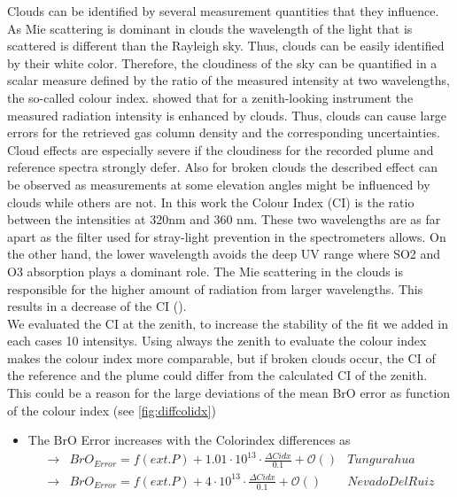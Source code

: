 \documentclass  [
  paper    = a4,
  BCOR     = 10mm,
  twoside,
  fontsize = 12pt,
  fleqn,
  toc      = bibnumbered,
  toc      = listofnumbered,
  numbers  = noendperiod,
  headings = normal,
  listof   = leveldown,
  version  = 3.03
]                                       {scrreprt}
\begin{document}
	Clouds can be identified by several measurement quantities that they influence.
	As Mie scattering is dominant in clouds the wavelength of the light that is scattered is different than the Rayleigh sky. Thus, clouds can be easily identified by their white color.
	Therefore, the cloudiness of the sky can be quantified in a scalar measure defined by the ratio of the measured intensity at two wavelengths, the so-called colour index.
	\cite{wagner2014cloud} showed that for a zenith-looking instrument the measured radiation intensity is enhanced by clouds. Thus, clouds can cause large errors for the retrieved gas column density and the corresponding uncertainties. 
	Cloud effects are especially severe if the cloudiness for the recorded plume and reference spectra strongly defer. Also for broken clouds the described effect can be observed as measurements at some elevation angles might be influenced by clouds while others are not.
	In this work the Colour Index (CI) is the ratio between the intensities at 320nm and 360 nm.
	These two wavelengths are as far apart as the filter used for stray-light prevention in the spectrometers allows.
	On the other hand, the lower wavelength avoids the deep UV range where SO2 and O3 absorption plays a dominant role.
	The Mie scattering in the clouds is responsible for the higher amount of radiation from larger wavelengths. This results in a decrease of the CI (\cite{lubcke2014optical}).
	\\
	We evaluated the CI at the zenith, to increase the stability of the fit we added in each cases 10 intensitys. Using always the zenith to evaluate the colour index makes the colour index more comparable, but if broken clouds occur, the CI of the reference and the plume could differ from the calculated CI of the zenith. This could be a reason for the large deviations of the mean BrO error as function of the colour index (see \cref{fig:diffcolidx})

	\begin{itemize}
		\item 	The BrO Error increases with the Colorindex differences as \\
		\begin{align*}
		\rightarrow&  BrO_{Error} = f(ext. P)+ 1.01\cdot10^{13}\cdot\frac{\Delta Cidx}{0.1} + \mathcal{O}\left(\right) & Tungurahua\\
		\rightarrow&  BrO_{Error} = f(ext. P)+  4\cdot10^{13}\cdot\frac{\Delta Cidx}{0.1} + \mathcal{O}\left(\right) & Nevado Del Ruiz\\
		\end{align*}
	\end{itemize}
\end{document}
